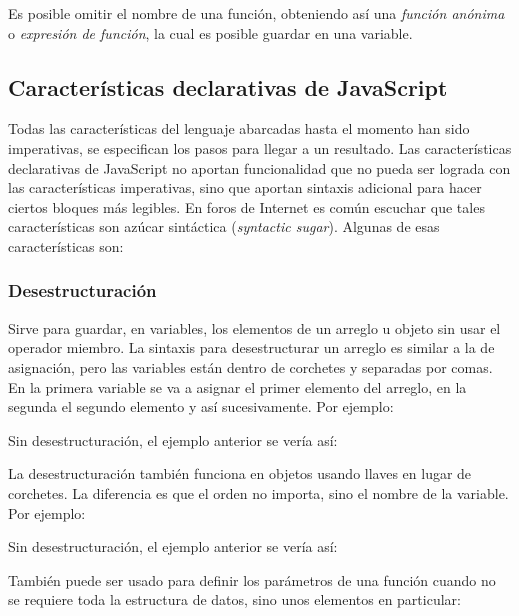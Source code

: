 \documentclass{article}
\newcommand{\codejs}[1]{\tcbox{\lstinline[style=ES6]{#1}}}
\newcommand{\jsfile}[2]{}
\begin{document}
Es posible omitir el nombre de una función, obteniendo así una \textit{función anónima} o \textit{expresión de función}, la cual es posible guardar en una variable.
\jsfile{Funciones anónimas}{code/functions/triple.js}


\subsection{Características declarativas de JavaScript}
Todas las características del lenguaje abarcadas hasta el momento han sido imperativas, se especifican los pasos para llegar a un resultado. Las características declarativas de JavaScript no aportan funcionalidad que no pueda ser lograda con las características imperativas, sino que aportan sintaxis adicional para hacer ciertos bloques más legibles. En foros de Internet es común escuchar que tales características son azúcar sintáctica (\textit{syntactic sugar}). Algunas de esas características son:

\subsubsection{Desestructuración}
Sirve para guardar, en variables, los elementos de un arreglo u objeto sin usar el operador miembro. La sintaxis para desestructurar un arreglo es similar a la de asignación, pero las variables están dentro de corchetes \codejs{[ ]} y separadas por comas. En la primera variable se va a asignar el primer elemento del arreglo, en la segunda el segundo elemento y así sucesivamente. Por ejemplo:
\jsfile{Asignar en variables los elementos de un arreglo usando desestructuración}{code/destructing/array-using-destructing.js}
Sin desestructuración, el ejemplo anterior se vería así:
\jsfile{Asignar en variables los elementos de un arreglo sin desestructuración}{code/destructing/array-using-member.js}
La desestructuración también funciona en objetos usando llaves \codejs{\{ \}} en lugar de corchetes. La diferencia es que el orden no importa, sino el nombre de la variable. Por ejemplo:
\jsfile{Asignar en variables los elementos de un objeto usando desestructuración}{code/destructing/object-using-destructing.js}
Sin desestructuración, el ejemplo anterior se vería así:
\jsfile{Asignar en variables los elementos de un objeto sin desestructuración}{code/destructing/object-using-member.js}
También puede ser usado para definir los parámetros de una función cuando no se requiere toda la estructura de datos, sino unos elementos en particular:
\jsfile{Desestructuración en los parámetros de una función}{code/destructing/functions.js}
\end{document}
